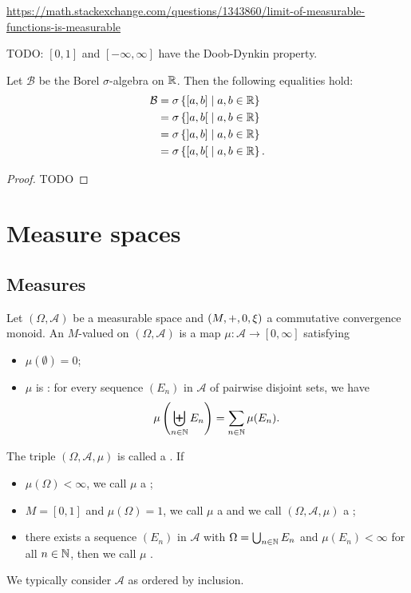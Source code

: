 \url{https://math.stackexchange.com/questions/1343860/limit-of-measurable-functions-is-measurable}

\begin{proposition}
TODO: $[0,1]$ and $[-\infty,\infty]$ have the Doob-Dynkin property.
\end{proposition}

\begin{proposition}
Let $\mathcal{B}$ be the Borel $\sigma$-algebra on $\mathbb{R}$. Then the following equalities hold:
\begin{align*}
\mathcal{B} &= \sigma\left\{ [a,b] \;\middle|\; a,b\in \mathbb{R} \right\} \\
&= \sigma\left\{ ]a,b[ \;\middle|\; a,b\in \mathbb{R} \right\} \\
&= \sigma\left\{ ]a,b] \;\middle|\; a,b\in \mathbb{R} \right\} \\
&= \sigma\left\{ [a,b[ \;\middle|\; a,b\in \mathbb{R} \right\}.
\end{align*}
\end{proposition}
\begin{proof}
TODO
\end{proof}

\section{Measure spaces}
\subsection{Measures}
\begin{definition}
Let $(\Omega,\mathcal{A})$ be a measurable space and $\left( M,+,0,\xi \right)$ a commutative convergence monoid. An $M$-valued  on $(\Omega,\mathcal{A})$ is a map $\mu: \mathcal{A} \to [0,\infty]$ satisfying
\begin{itemize}
\item $\mu(\emptyset) = 0$;
\item $\mu$ is : for every sequence $(E_n)$ in $\mathcal{A}$ of pairwise disjoint sets, we have
\[ \mu\left(\biguplus_{n\in\mathbb{N}}E_n\right) = \sum_{n\in\mathbb{N}}\mu(E_n). \]
\end{itemize}
The triple $(\Omega, \mathcal{A}, \mu)$ is called a . If
\begin{itemize}
\item $\mu(\Omega) < \infty$, we call $\mu$ a ;
\item $M = [0,1]$ and $\mu(\Omega) = 1$, we call $\mu$ a  and we call $(\Omega, \mathcal{A}, \mu)$ a ;
\item there exists a sequence $(E_n)$ in $\mathcal{A}$ with $\Omega = \bigcup_{n\in\mathbb{N}}E_n$ and $\mu(E_n)<\infty$ for all $n\in\mathbb{N}$, then we call $\mu$ .
\end{itemize}
\end{definition}
We typically consider $\mathcal{A}$ as ordered by inclusion.

